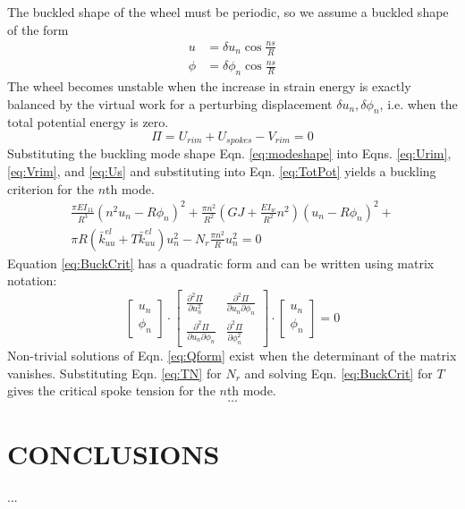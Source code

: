 \documentclass{bmd2016p}
\begin{document}
The buckled shape of the wheel must be periodic, so we assume a buckled shape of the form
\begin{equation}\label{eq:modeshape}
\begin{split}
u &= \delta u_n \cos{\frac{ns}{R}} \\
\phi &= \delta\phi_n \cos{\frac{ns}{R}}
\end{split}
\end{equation}
The wheel becomes unstable when the increase in strain energy is exactly balanced by the virtual work for a perturbing displacement $\delta u_n, \delta\phi_n$, i.e. when the total potential energy is zero.
\begin{equation}\label{eq:TotPot}
\Pi = U_{rim} + U_{spokes} - V_{rim} = 0
\end{equation}
Substituting the buckling mode shape Eqn. \ref{eq:modeshape} into Eqns. \ref{eq:Urim}, \ref{eq:Vrim}, and \ref{eq:Us} and substituting into Eqn. \ref{eq:TotPot} yields a buckling criterion for the $n$th mode.
\begin{multline}\label{eq:BuckCrit}
\frac{\pi EI_{11}}{R^3}(n^2 u_n - R\phi_n)^2 + \frac{\pi n^2}{R^2}\left(GJ + \frac{EI_w}{R^2}n^2\right)(u_n-R\phi_n)^2 + \\
\pi R(\bar{k}_{uu}^{el} + T\bar{k}_{uu}^{el})u_n^2 - N_r\frac{\pi n^2}{R}u_n^2=0
\end{multline}
Equation \ref{eq:BuckCrit} has a quadratic form and can be written using matrix notation:
\begin{equation}\label{eq:Qform}
\begin{bmatrix}
u_n\\\phi_n
\end{bmatrix} \cdot
\begin{bmatrix}
\frac{\partial^2 \Pi}{\partial u_n^2} & \frac{\partial^2 \Pi}{\partial u_n \partial \phi_n}\\
\frac{\partial^2 \Pi}{\partial u_n\partial\phi_n} & \frac{\partial^2 \Pi}{\partial \phi_n^2}
\end{bmatrix} \cdot
\begin{bmatrix}
u_n\\\phi_n
\end{bmatrix}
=0
\end{equation}
Non-trivial solutions of Eqn. \ref{eq:Qform} exist when the determinant of the matrix vanishes. Substituting Eqn. \ref{eq:TN} for $N_r$ and solving Eqn. \ref{eq:BuckCrit} for $T$ gives the critical spoke tension for the $n$th mode.
\begin{equation}
...
\end{equation}



\section{CONCLUSIONS}

...



\end{document}
